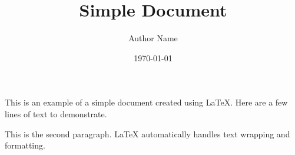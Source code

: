 \documentclass{article}
\begin{document}
\title{Simple Document}
\author{Author Name}
\date{\today}

\maketitle

This is an example of a simple document created using LaTeX. Here are a few lines of text to demonstrate.

This is the second paragraph. LaTeX automatically handles text wrapping and formatting.
\end{document}
